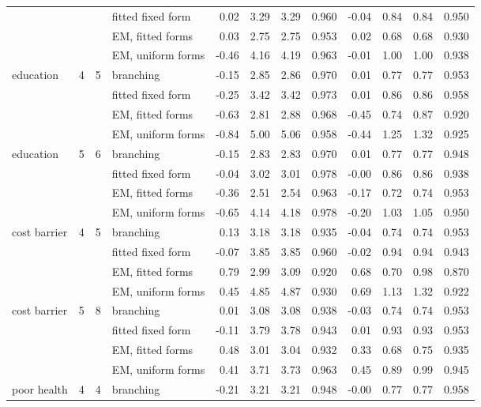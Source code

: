 \begin{table}[h]
\begin{tabular}{lrrlrrrrrrrr}
 &  &  & fitted fixed form & 0.02 & 3.29 & 3.29 & 0.960 & -0.04 & 0.84 & 0.84 & 0.950 \\
 &  &  & EM, fitted forms & 0.03 & 2.75 & 2.75 & 0.953 & 0.02 & 0.68 & 0.68 & 0.930 \\
 &  &  & EM, uniform forms & -0.46 & 4.16 & 4.19 & 0.963 & -0.01 & 1.00 & 1.00 & 0.938 \\
education & 4 & 5 & branching & -0.15 & 2.85 & 2.86 & 0.970 & 0.01 & 0.77 & 0.77 & 0.953 \\
 &  &  & fitted fixed form & -0.25 & 3.42 & 3.42 & 0.973 & 0.01 & 0.86 & 0.86 & 0.958 \\
 &  &  & EM, fitted forms & -0.63 & 2.81 & 2.88 & 0.968 & -0.45 & 0.74 & 0.87 & 0.920 \\
 &  &  & EM, uniform forms & -0.84 & 5.00 & 5.06 & 0.958 & -0.44 & 1.25 & 1.32 & 0.925 \\
education & 5 & 6 & branching & -0.15 & 2.83 & 2.83 & 0.970 & 0.01 & 0.77 & 0.77 & 0.948 \\
 &  &  & fitted fixed form & -0.04 & 3.02 & 3.01 & 0.978 & -0.00 & 0.86 & 0.86 & 0.938 \\
 &  &  & EM, fitted forms & -0.36 & 2.51 & 2.54 & 0.963 & -0.17 & 0.72 & 0.74 & 0.953 \\
 &  &  & EM, uniform forms & -0.65 & 4.14 & 4.18 & 0.978 & -0.20 & 1.03 & 1.05 & 0.950 \\
cost barrier & 4 & 5 & branching & 0.13 & 3.18 & 3.18 & 0.935 & -0.04 & 0.74 & 0.74 & 0.953 \\
 &  &  & fitted fixed form & -0.07 & 3.85 & 3.85 & 0.960 & -0.02 & 0.94 & 0.94 & 0.943 \\
 &  &  & EM, fitted forms & 0.79 & 2.99 & 3.09 & 0.920 & 0.68 & 0.70 & 0.98 & 0.870 \\
 &  &  & EM, uniform forms & 0.45 & 4.85 & 4.87 & 0.930 & 0.69 & 1.13 & 1.32 & 0.922 \\
cost barrier & 5 & 8 & branching & 0.01 & 3.08 & 3.08 & 0.938 & -0.03 & 0.74 & 0.74 & 0.953 \\
 &  &  & fitted fixed form & -0.11 & 3.79 & 3.78 & 0.943 & 0.01 & 0.93 & 0.93 & 0.953 \\
 &  &  & EM, fitted forms & 0.48 & 3.01 & 3.04 & 0.932 & 0.33 & 0.68 & 0.75 & 0.935 \\
 &  &  & EM, uniform forms & 0.41 & 3.71 & 3.73 & 0.963 & 0.45 & 0.89 & 0.99 & 0.945 \\
poor health & 4 & 4 & branching & -0.21 & 3.21 & 3.21 & 0.948 & -0.00 & 0.77 & 0.77 & 0.958 \\

\end{tabular}
\end{table}
